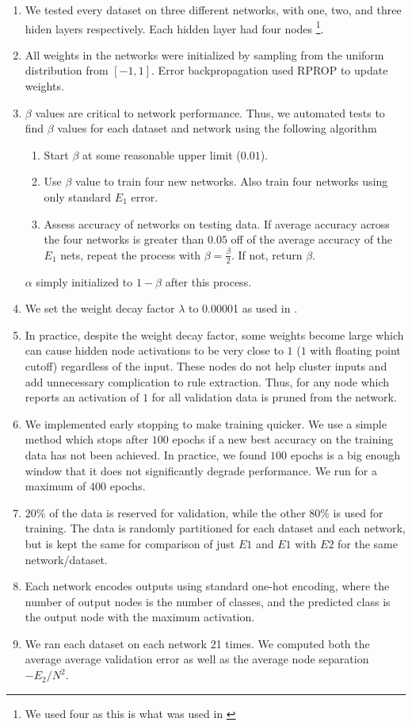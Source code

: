 \begin{enumerate}
\item
  We tested every dataset on three different networks, with one,
  two, and three hiden layers respectively. Each hidden layer had
  four nodes \footnote{We used four as this is what was used in \cite{thuan11}}.
\item
  All weights in the networks were initialized by sampling from the
  uniform distribution from $[-1,1]$. Error backpropagation used RPROP
  to update weights.
\item
  $\beta$ values are critical to network performance. Thus, we automated
  tests to find $\beta$ values for each dataset and network using the
  following algorithm
  \begin{enumerate}
  \item
    Start $\beta$ at some reasonable upper limit ($0.01$).
  \item
    Use $\beta$ value to train four new networks. Also train four
    networks using only standard $E_1$ error.
  \item
    Assess accuracy of networks on testing data. If average accuracy
    across the four networks is greater than $0.05$ off of the average
    accuracy of the $E_1$ nets, repeat the process with
    $\beta = \frac{\beta}{2}$. If not, return $\beta$.    
  \end{enumerate}
  $\alpha$ simply initialized to $1-\beta$ after this process.
\item
  We set the weight decay factor $\lambda$ to 0.00001 as used in \cite{thuan11}.
\item
  In practice, despite the weight decay factor, some weights become large which
  can cause hidden node activations to be very close to $1$ ($1$ with floating
  point cutoff) regardless of the input. These nodes do not help cluster inputs
  and add unnecessary complication to rule extraction. Thus, for any node which
  reports an activation of $1$ for all validation data is pruned from the
  network.
\item
  We implemented early stopping to make training quicker. We use a simple
  method which stops after $100$ epochs if a new best accuracy on the
  training data has not been achieved. In practice, we found $100$ epochs is
  a big enough window that it does not significantly degrade performance.
  We run for a maximum of $400$ epochs.
\item
  $20\%$ of the data is reserved for validation, while the other $80\%$ is
  used for training. The data is randomly partitioned for each dataset and
  each network, but is kept the same for comparison of just $E1$ and $E1$
  with $E2$ for the same network/dataset.
\item
  Each network encodes outputs using standard one-hot encoding, where the number
  of output nodes is the number of classes, and the predicted class is the
  output node with the maximum activation.
\item
  We ran each dataset on each network 21 times. We computed both the average
  average validation error as well as the average node separation
  $-E_2/N^2$.
\end{enumerate}

